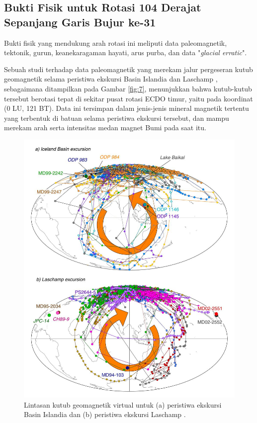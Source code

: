 \documentclass[10pt,twocolumn,letterpaper]{article}
\begin{document}
\subsection{Bukti Fisik untuk Rotasi 104 Derajat Sepanjang Garis Bujur ke-31}

Bukti fisik yang mendukung arah rotasi ini meliputi data paleomagnetik, tektonik, gurun, keanekaragaman hayati, arus purba, dan data "\textit{glacial erratic}".

Sebuah studi terhadap data paleomagnetik yang merekam jalur pergeseran kutub geomagnetik selama peristiwa ekskursi Basin Islandia dan Laschamp \cite{35}, sebagaimana ditampilkan pada Gambar \ref{fig:7}, menunjukkan bahwa kutub-kutub tersebut berotasi tepat di sekitar pusat rotasi ECDO timur, yaitu pada koordinat (0 LU, 121 BT). Data ini tersimpan dalam jenis-jenis mineral magnetik tertentu yang terbentuk di batuan selama peristiwa ekskursi tersebut, dan mampu merekam arah serta intensitas medan magnet Bumi pada saat itu.

\begin{figure}[t]
\begin{center}
   \includegraphics[width=0.95\linewidth]{laj.jpg}
\end{center}
   \caption{Lintasan kutub geomagnetik virtual untuk (a) peristiwa ekskursi Basin Islandia dan (b) peristiwa ekskursi Laschamp \cite{35}.}
\label{fig:7}
\label{fig:onecol}
\end{figure}
\end{document}
